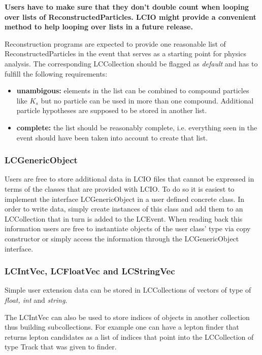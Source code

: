 \documentclass[twoside]{article}
\begin{document}
{\bf Users have to make sure that they don't double count when looping over lists of ReconstructedParticles. 
LCIO might provide a convenient method to help looping over lists in a future release.}

Reconstruction programs are expected to provide one reasonable list of ReconstructedParticles in the event
that serves as a starting point for physics analysis. The corresponding LCCollection should be flagged 
as {\em default} and has to fulfill the following requirements:
\begin{itemize}
\item{{\bf unambigous:} elements in the list can be combined to compound particles like $K_s$ but no particle
can be used in more than one compound. Additional particle hypotheses are supposed to  be stored in another 
list.}
\item{{\bf complete:} the list should be reasonably complete, i.e. everything seen in the event should have 
been taken into account to create that list.}
\end{itemize}


\subsubsection{LCGenericObject}
Users are free to store additional data in LCIO files that cannot be expressed in terms of the classes that 
are provided with LCIO. To do so it is easiest to implement the interface LCGenericObject in a user defined
concrete class. In order to write data, simply create instances of this class and add them to an LCCollection
that in turn is added to the LCEvent. When reading back this information users are free to instantiate 
objects of the user class' type via copy constructor or simply access the information through the
LCGenericObject interface.

\subsubsection{LCIntVec, LCFloatVec and LCStringVec}
Simple user extension data can be stored in LCCollections of vectors of type of {\em float, int} and {\em string}. 

The LCIntVec can also be used to store indices of objects in another collection thus building
subcollections. For example one can have a lepton finder that returns lepton candidates as a list of 
indices that point into the LCCollection of type Track that was given to finder.
\end{document}
